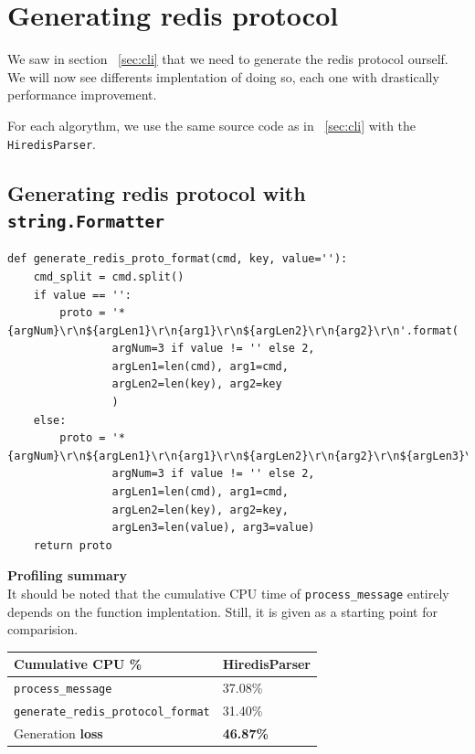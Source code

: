 \documentclass[a4paper, 11pt]{report}
\begin{document}
\newpage
\section{Generating redis protocol\label{sec:proto}}
We saw in section ~\ref{sec:cli} that we need to generate the redis protocol ourself. We will now see differents implentation of doing so, each one with drastically performance improvement.

For each algorythm, we use the same source code as in ~\ref{sec:cli} with the \texttt{HiredisParser}.

\subsection{Generating redis protocol with \texttt{string.Formatter} \label{sec:proto1}}

\begin{lstlisting}
def generate_redis_proto_format(cmd, key, value=''):
    cmd_split = cmd.split()
    if value == '':
        proto = '*{argNum}\r\n${argLen1}\r\n{arg1}\r\n${argLen2}\r\n{arg2}\r\n'.format(
                argNum=3 if value != '' else 2,
                argLen1=len(cmd), arg1=cmd,
                argLen2=len(key), arg2=key
                )
    else:
        proto = '*{argNum}\r\n${argLen1}\r\n{arg1}\r\n${argLen2}\r\n{arg2}\r\n${argLen3}\r\n{arg3}\r\n'.format(
                argNum=3 if value != '' else 2,
                argLen1=len(cmd), arg1=cmd,
                argLen2=len(key), arg2=key,
                argLen3=len(value), arg3=value)
    return proto
\end{lstlisting}

\textbf{Profiling summary}\\
It should be noted that the cumulative CPU time of \texttt{process\_message} entirely depends on the function implentation. Still, it is given as a starting point for comparision.\\

\begin{tabular}{|l|l|}
    \hline
    Cumulative CPU \% & HiredisParser\\
    \hline
    \texttt{process\_message} & 37.08\%\\
    \hline
    \texttt{generate\_redis\_protocol\_format} & 31.40\%\\
    \hline
    Generation \textbf{loss}\footnotemark & \textbf{46.87\%}\\
    \hline
\end{tabular}
\end{document}
